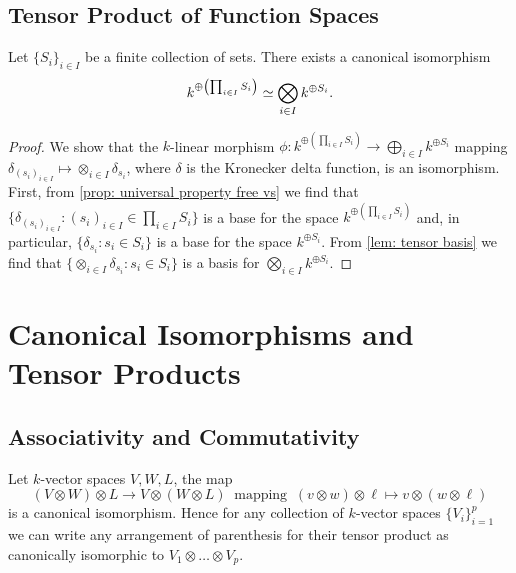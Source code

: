 
\subsection{Tensor Product of Function Spaces}

\begin{proposition}
  Let \(\{S_i\}_{i \in I}\) be a finite collection of sets. There exists a
  canonical isomorphism
  \[
    k^{\oplus \left( \prod_{i \in I} S_i \right)} \simeq \bigotimes_{i \in I}
    k^{\oplus S_i}.
  \]
\end{proposition}

\begin{proof}
  We show that the \(k\)-linear morphism \(\phi: k^{\oplus \left( \prod_{i \in
  I} S_i \right)} \to \bigoplus_{i \in I} k^{\oplus S_i}\) mapping
  \(\delta_{(s_i)_{i \in I}} \mapsto \otimes_{i \in I} \delta_{s_i}\), where
  \(\delta\) is the Kronecker delta function, is an isomorphism. First, from
  \cref{prop: universal property free vs} we find that \(\{\delta_{(s_i)_{i \in
  I}} : (s_i)_{i \in I} \in \prod_{i \in I} S_i\}\) is a base for the space
  \(k^{\oplus \left( \prod_{i \in I} S_i \right)}\) and, in particular,
  \(\{\delta_{s_i} : s_i \in S_i\}\) is a base for the space \(k^{\oplus S_i}\).
  From \cref{lem: tensor basis} we find that \(\{\otimes_{i \in I} \delta_{s_i}
  : s_i \in S_i\}\) is a basis for \(\bigotimes_{i \in I} k^{\oplus S_i}\).
\end{proof}

\section{Canonical Isomorphisms and Tensor Products}

\subsection{Associativity and Commutativity}

\begin{proposition}[Associativity]\label{prop: associativity tensor prod}
  Let \(k\)-vector spaces \(V, W, L\), the map
  \[
    (V \otimes W) \otimes L \to V \otimes (W \otimes L)\ \text{ mapping }\ (v
    \otimes w) \otimes \ell \mapsto v \otimes (w \otimes \ell)
  \]
  is a canonical isomorphism. Hence for any collection of \(k\)-vector spaces
  \(\{V_i\}_{i=1}^p\) we can write any arrangement of parenthesis for their
  tensor product as canonically isomorphic to \(V_1 \otimes \dots \otimes V_p\).
\end{proposition}

